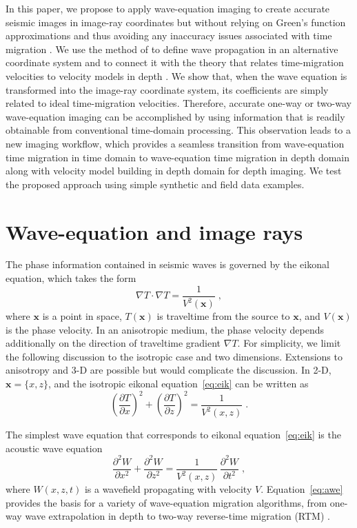 In this paper, we propose to apply wave-equation imaging to create
accurate seismic images in image-ray coordinates but without relying
on Green's function approximations and thus avoiding any inaccuracy
issues associated with time migration \cite[]{fomel2013wave}. We use the method
of \cite{sava2005riemannian} to define wave propagation in an alternative
coordinate system and to connect it with the theory that relates
time-migration velocities to velocity models in depth \cite[]{ip}. We
show that, when the wave equation is transformed into the image-ray
coordinate system, its coefficients are simply related to ideal
time-migration velocities. Therefore, accurate one-way or two-way
wave-equation imaging can be accomplished by using information that is
readily obtainable from conventional time-domain processing. This
observation leads to a new imaging workflow, which provides a seamless
transition from wave-equation
time migration in time domain to wave-equation
time migration in depth domain along with velocity model building in depth domain for depth imaging. We test the proposed approach using simple synthetic and field data examples.

\section{Wave-equation and image rays}
The phase information contained in seismic waves is governed by the
eikonal equation, which takes the form \cite[]{chapman}
\begin{equation}
\label{eq:eik}
\nabla T \cdot \nabla T = \frac{1}{V^2(\mathbf{x})}\;,
\end{equation}
where $\mathbf{x}$ is a point in space, $T(\mathbf{x})$ is 
traveltime from the source to $\mathbf{x}$, and $V(\mathbf{x})$ is the
phase velocity. In an anisotropic medium, the phase velocity depends
additionally on the direction of traveltime gradient $\nabla
T$. For simplicity, we limit the following discussion to the isotropic
case and two dimensions. Extensions to anisotropy and 3-D are possible
but would complicate the discussion. In 2-D, $\mathbf{x}=\{x,z\}$, and 
the isotropic eikonal equation~\ref{eq:eik} can be written as
\begin{equation}
\label{eq:eik2}
\left(\frac{\partial T}{\partial x}\right)^2 + \left(\frac{\partial T}{\partial z}\right)^2 = \frac{1}{V^2(x,z)}\;.
\end{equation}

The simplest wave equation that corresponds to eikonal
equation~\ref{eq:eik} is the acoustic wave equation
\begin{equation}
\label{eq:awe}
\frac{\partial^2 W}{\partial x^2} + \frac{\partial^2 W}{\partial z^2} = \frac{1}{V^2(x,z)}\,\frac{\partial^2 W}{\partial t^2}\;,
\end{equation}
where $W(x,z,t)$ is a wavefield propagating with velocity
$V$. Equation~\ref{eq:awe} provides the basis for a variety of
wave-equation migration algorithms, from one-way wave extrapolation in
depth to two-way reverse-time migration (RTM) \cite[]{biondi,etgen}. 

